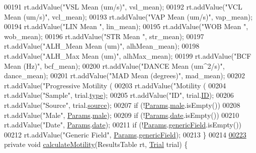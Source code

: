 \begin{DoxyCode}
{{00191     rt.addValue(\textcolor{stringliteral}{"VSL Mean (um/s)"}, vsl\_mean);
00192     rt.addValue(\textcolor{stringliteral}{"VCL Mean (um/s)"}, vcl\_mean);
00193     rt.addValue(\textcolor{stringliteral}{"VAP Mean (um/s)"}, vap\_mean);
00194     rt.addValue(\textcolor{stringliteral}{"LIN Mean "}, lin\_mean);
00195     rt.addValue(\textcolor{stringliteral}{"WOB Mean "}, wob\_mean);
00196     rt.addValue(\textcolor{stringliteral}{"STR Mean "}, str\_mean);
00197     rt.addValue(\textcolor{stringliteral}{"ALH\_Mean Mean (um)"}, alhMean\_mean);
00198     rt.addValue(\textcolor{stringliteral}{"ALH\_Max Mean (um)"}, alhMax\_mean);
00199     rt.addValue(\textcolor{stringliteral}{"BCF Mean (Hz)"}, bcf\_mean);
00200     rt.addValue(\textcolor{stringliteral}{"DANCE Mean (um^2/s)"}, dance\_mean);
00201     rt.addValue(\textcolor{stringliteral}{"MAD Mean (degrees)"}, mad\_mean);
00202     rt.addValue(\textcolor{stringliteral}{"Progressive Motility (%
00203     rt.addValue(\textcolor{stringliteral}{"Motility (%
00204     rt.addValue(\textcolor{stringliteral}{"Sample"}, trial.\hyperlink{classdata_1_1_trial_a0b86e44425dbe3c9d866aa273f87828a}{type});
00205     rt.addValue(\textcolor{stringliteral}{"ID"}, trial.\hyperlink{classdata_1_1_trial_a317298c3409575f71e43acd3f73ce295}{ID});
00206     rt.addValue(\textcolor{stringliteral}{"Source"}, trial.\hyperlink{classdata_1_1_trial_a00baeba9d13a88ce01098a02d1e570d5}{source});
00207     \textcolor{keywordflow}{if} (!\hyperlink{classdata_1_1_params}{Params}.\hyperlink{classdata_1_1_params_a3e07114fb70a676dfe24fad6be8c3c75}{male}.isEmpty())
00208       rt.addValue(\textcolor{stringliteral}{"Male"}, \hyperlink{classdata_1_1_params}{Params}.\hyperlink{classdata_1_1_params_a3e07114fb70a676dfe24fad6be8c3c75}{male});
00209     \textcolor{keywordflow}{if} (!\hyperlink{classdata_1_1_params}{Params}.\hyperlink{classdata_1_1_params_aecbab8174a6d72649883508cf9940d58}{date}.isEmpty())
00210       rt.addValue(\textcolor{stringliteral}{"Date"}, \hyperlink{classdata_1_1_params}{Params}.\hyperlink{classdata_1_1_params_aecbab8174a6d72649883508cf9940d58}{date});
00211     \textcolor{keywordflow}{if} (!\hyperlink{classdata_1_1_params}{Params}.\hyperlink{classdata_1_1_params_a253e4e926c0399ed1ae42b5a5989824d}{genericField}.isEmpty())
00212       rt.addValue(\textcolor{stringliteral}{"Generic Field"}, \hyperlink{classdata_1_1_params}{Params}.\hyperlink{classdata_1_1_params_a253e4e926c0399ed1ae42b5a5989824d}{genericField});
00213   \}
00214 
\hypertarget{_motility_8java_source_l00223}{}\hyperlink{classanalysis_1_1_motility_a02cd8027747b70728a837c58fdf75cb4}{00223}   \textcolor{keyword}{private} \textcolor{keywordtype}{void} \hyperlink{classanalysis_1_1_motility_a02cd8027747b70728a837c58fdf75cb4}{calculateMotility}(ResultsTable rt, \hyperlink{classdata_1_1_trial}{Trial} trial) \{
}}}}
\end{DoxyCode}
